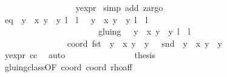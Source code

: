 \begin{isabellebody}
\ \ \ \ \ \ \ \ \ \ \ \ \ \ \ \ \isamarkupfalse%
\ y{\isacharunderscore}expr\ \isamarkupfalse%
{\isacharparenleft}simp\ add{\isacharcolon}\ z{}{\isacharcomma}argo{\isacharparenright}\ \isanewline
\ \ \ \ \ \ \ \ \ \ \ \ \isamarkupfalse%
\ eq{\isacharcolon}\ {\isachardoublequoteopen}{\isacharbraceleft}{\isacharparenleft}{\isasymrho}\ {\isacharparenleft}y\ {\isacharasterisk}\ x{\isacharprime}{\isacharcomma}\ y\ {\isacharasterisk}\ y{\isacharprime}{\isacharparenright}{\isacharcomma}\ l\ {\isacharplus}\ l{\isacharprime}{\isacharparenright}{\isacharcomma}\ {\isacharparenleft}{\isasymtau}\ {\isacharparenleft}{\isasymrho}\ {\isacharparenleft}y\ {\isacharasterisk}\ x{\isacharprime}{\isacharcomma}\ y\ {\isacharasterisk}\ y{\isacharprime}{\isacharparenright}{\isacharparenright}{\isacharcomma}\ l\ {\isacharplus}\ l{\isacharprime}\ {\isacharplus}\ {}{\isacharparenright}{\isacharbraceright}\isanewline
\ \ \ \ \ \ \ \ \ \ \ \ \ \ \ \ \ \ \ \ \ \ {\isacharequal}\ gluing\ {\isacharbackquote}{\isacharbackquote}\ {\isacharbraceleft}{\isacharparenleft}{\isasymrho}\ {\isacharparenleft}y\ {\isacharasterisk}\ x{\isacharprime}{\isacharcomma}\ y\ {\isacharasterisk}\ y{\isacharprime}{\isacharparenright}{\isacharcomma}\ l\ {\isacharplus}\ l{\isacharprime}{\isacharparenright}{\isacharbraceright}{\isachardoublequoteclose}\isanewline
\ \ \ \ \ \ \ \ \ \ \ \ \isamarkupfalse%
\ {\isacharminus}\isanewline
\ \ \ \ \ \ \ \ \ \ \ \ \ \ \isamarkupfalse%
\ coord{\isacharcolon}\ {\isachardoublequoteopen}fst\ {\isacharparenleft}{\isasymrho}\ {\isacharparenleft}y\ {\isacharasterisk}\ x{\isacharprime}{\isacharcomma}\ y\ {\isacharasterisk}\ y{\isacharprime}{\isacharparenright}{\isacharparenright}\ {\isasymnoteq}\ {}{\isachardoublequoteclose}\ {\isachardoublequoteopen}snd\ {\isacharparenleft}{\isasymrho}\ {\isacharparenleft}y\ {\isacharasterisk}\ x{\isacharprime}{\isacharcomma}\ y\ {\isacharasterisk}\ y{\isacharprime}{\isacharparenright}{\isacharparenright}\ {\isasymnoteq}\ {}{\isachardoublequoteclose}\ \isanewline
\ \ \ \ \ \ \ \ \ \ \ \ \ \ \ \ \isamarkupfalse%
\ y{\isacharunderscore}expr\ cc\ \isamarkupfalse%
\ auto\isanewline
\ \ \ \ \ \ \ \ \ \ \ \ \ \ \isamarkupfalse%
\ {\isacharquery}thesis\isanewline
\ \ \ \ \ \ \ \ \ \ \ \ \ \ \ \ \isamarkupfalse%
\ gluing{\isacharunderscore}class{\isacharbrackleft}OF\ coord{\isacharparenleft}{}{\isacharparenright}\ coord{\isacharparenleft}{}{\isacharparenright}{\isacharbrackright}\ rho{\isacharunderscore}aff\ \isamarkupfalse%

\end{isabellebody}
